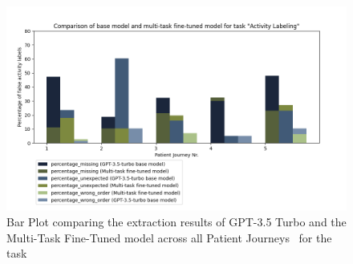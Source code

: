 \begin{figure}[h]
    \centering
    \captionsetup{belowskip=0pt,aboveskip=0pt}
    \includegraphics[width=\textwidth]{bachelor_thesis/images/activities_all.png}
    \caption{Bar Plot comparing the extraction results of GPT-3.5 Turbo and the Multi-Task Fine-Tuned model across all Patient Journeys~ for the task } 
    \label{fig:eval_activities_bar}
\end{figure}

